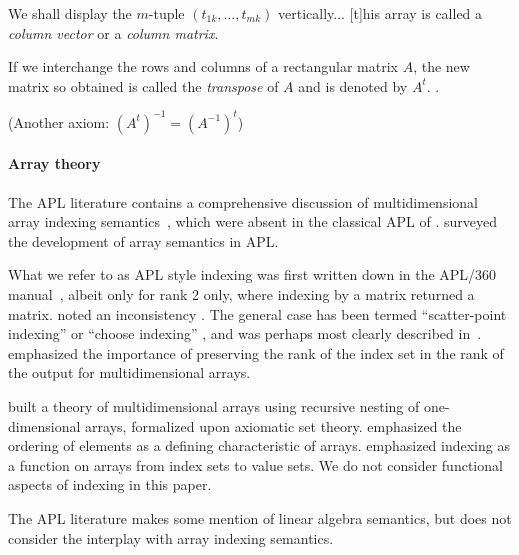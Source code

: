 We shall display the $m$-tuple $(t_{1k}, \dots, t_{mk})$ vertically... [t]his array is called a \textit{column vector} or a \textit{column matrix}.

If we interchange the rows and columns of a rectangular matrix $A$, the new matrix so obtained is called the \textit{transpose} of $A$ and is denoted by $A^t$. \cite[p. 615, Exercise 7]{Apostol1967}.

(Another axiom: $(A^t)^{-1} = (A^{-1})^t$)

\paragraph{Array theory} The APL literature contains a comprehensive discussion
of multidimensional array indexing semantics~\cite{Brown1982}, which were
absent in the classical APL of \cite{Iverson1962}. \cite{Ruehr1982,Gerth1988}
surveyed the development of array semantics in APL.

What we refer to as APL style indexing was first written down in the APL/360
manual~\cite{Falkoff1968}, albeit only for rank 2 only, where indexing by a
matrix returned a matrix. \cite{Haegi1976} noted an inconsistency . The general
case has been termed ``scatter-point indexing'' or ``choose indexing''
\cite{Brown1972,Ruehr1982}, and was perhaps most clearly described
in~\cite{More1979}. \cite{Gull1979} emphasized the importance of preserving
the rank of the index set in the rank of the output for multidimensional
arrays.

\cite{More1973} built a theory of multidimensional arrays using recursive
nesting of one-dimensional arrays, formalized upon axiomatic set theory.
\cite{Ghandour1973} emphasized the ordering of elements as a defining
characteristic of arrays. \cite{Gerth1988} emphasized indexing as a function on
arrays from index sets to value sets. We do not consider functional aspects of
indexing in this paper.

The APL literature makes some mention of linear algebra semantics, but does not
consider the interplay with array indexing semantics.

